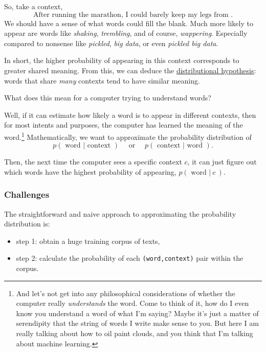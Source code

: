 \documentclass[11pt]{article}
\begin{document}
So, take a context,
\[\textrm{After running the marathon, I could barely keep my legs from .}\]
We should have a sense of what words could fill the blank. Much more
likely to appear are words like \emph{shaking}, \emph{trembling}, and of
course, \emph{wappering}. Especially compared to nonsense like
\emph{pickled}, \emph{big data}, or even \emph{pickled big data}.

In short, the higher probability of appearing in this context
corresponds to greater shared meaning. From this, we can deduce the
\href{https://en.wikipedia.org/wiki/Distributional_semantics\#Distributional_hypothesis}{distributional
hypothesis}: words that share \emph{many} contexts tend to have similar
meaning.

What does this mean for a computer trying to understand words?

Well, if it can estimate how likely a word is to appear in different
contexts, then for most intents and purposes, the computer has learned
the meaning of the word.\footnote{And let's not get into any
  philosophical considerations of whether the computer really
  \emph{understands} the word. Come to think of it, how do I even know
  you understand a word of what I'm saying? Maybe it's just a matter of
  serendipity that the string of words I write make sense to you. But
  here I am really talking about how to oil paint clouds, and you think
  that I'm talking about machine learning.} Mathematically, we want to
approximate the probability distribution of
\[p(\textrm{ word } | \textrm{ context }) \quad\textrm{ or }\quad p(\textrm{ context }|\textrm{ word }).\]

Then, the next time the computer sees a specific context \(c\), it can
just figure out which words have the highest probability of appearing,
\(p(\textrm{ word }|\ c\ )\).

\subsubsection*{Challenges}\label{challenges}

The straightforward and naive approach to approximating the probability
distribution is:

\begin{itemize}
\item
  step 1: obtain a huge training corpus of texts,
\item
  step 2: calculate the probability of each \texttt{(word,context)} pair
  within the corpus.
\end{itemize}
\end{document}
